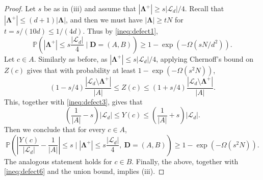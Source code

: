 \documentclass{amsart}
\theoremstyle{definition}
\newcommand{\cL}{\mathcal{L} }
\newcommand{\0}[0]{\emptyset}
\newcommand{\pr}[0]{\mathbb{P}}
\begin{document}
\begin{proof}
Let $s$ be as in (iii) and assume that $|\mathbf\Lambda^+|\geq s|\cL_d|/4$.
Recall that $|\mathbf\Lambda^+| \leq (d+1)|\mathbf\Lambda|$, and then we must have $|\mathbf\Lambda|\geq tN$ for $t=s/(10d) \leq 1/(4d)$.
Thus by \eqref{ineq:defect1}, 
\begin{equation}\label{ineq:defect6}
\pr\left(|\mathbf\Lambda^+|\leq s\frac{|\cL_d|}{4} \mid \mathbf D=(A, B)\right) \geq 1 - \exp\left(-\Omega\left(sN/d^2\right)\right).
\end{equation}
Let $c\in A$. Similarly as before, as $|\mathbf\Lambda^+|\leq s|\cL_d|/4$, applying Chernoff's bound on $Z(c)$ gives that with probability at least $1 - \exp\left(-\Omega\left(s^2N\right)\right)$,
\[
(1 - s/4)\frac{|\cL_d\setminus\mathbf\Lambda^+|}{|A|} \leq Z(c)\leq (1 + s/4)\frac{|\cL_d\setminus\mathbf\Lambda^+|}{|A|}.
\]
This, together with \eqref{ineq:defect3}, gives that
\[
\left(\frac{1}{|A|}-s\right)|\cL_d|\leq Y(c) \leq \left(\frac{1}{|A|}+s\right)|\cL_d|.
\]
Then we conclude that for every $c\in A$,
\[
\pr\left(\left|\frac{Y(c)}{|\cL_d|} - \frac{1}{|A|}\right|\leq s \mid |\mathbf\Lambda^+|\leq s\frac{|\cL_d|}{4}, \  \mathbf D=(A, B)\right)
\geq 1 - \exp\left(-\Omega\left(s^2N\right)\right).
\]
The analogous statement holds for $c\in B$. Finally, the above, together with \eqref{ineq:defect6} and the union bound, implies (iii).
\end{proof}
\end{document}

